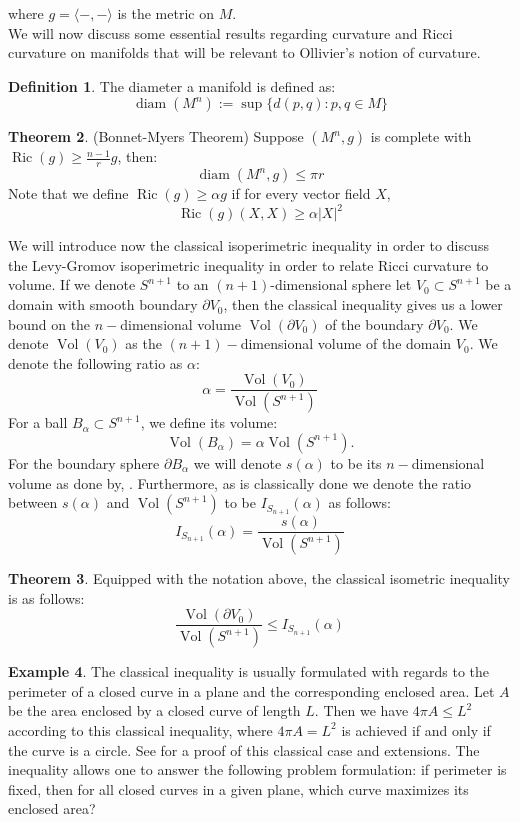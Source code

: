\documentclass{Dissertate}
\theoremstyle{definition}
\newtheorem{theorem}{Theorem}[section]
\theoremstyle{definition} %
\theoremstyle{definition}
\newtheorem{definition}[theorem]{Definition}
\newtheorem{example}[theorem]{Example}
\begin{document}
where $g=\langle-,-\rangle$ is the metric on $M$.\\
\vspace{0.5in}
We will now discuss some essential results regarding curvature and Ricci curvature on manifolds that will be relevant to Ollivier's notion of curvature.

\begin{definition}
The diameter a manifold is defined as:
$$
\operatorname{diam}(M^n):=\sup \{d(p, q): p, q \in M\}
$$
\end{definition}
\begin{theorem} (Bonnet-Myers Theorem)
Suppose $\left(M^{n}, g\right)$ is complete with $\operatorname{Ric}(g) \geq \frac{n-1}{r} g$, then:
$$
\operatorname{diam}\left(M^{n}, g\right) \leq \pi r
$$
Note that we define $\operatorname{Ric}(g) \geq \alpha g$ if for every vector field $X$,
$$
\operatorname{Ric}(g)(X, X) \geq \alpha|X|^{2}
$$
\end{theorem}
We will introduce now the classical isoperimetric inequality in order to discuss the Levy-Gromov isoperimetric inequality in order to relate Ricci curvature to volume.  If we denote $S^{n+1}$ to an $(n+1)$-dimensional sphere let $V_{0} \subset S^{n+1}$ be a domain with smooth boundary $\partial V_{0} $, then the classical inequality gives us a lower bound on the $n-$dimensional volume $\operatorname{Vol}(\partial V_0)$ of the boundary $\partial V_0$. We denote $\operatorname{Vol}(V_0)$ as the $(n+1)-$dimensional volume of the domain $V_0$. We denote the following ratio as $\alpha$:
$$
\alpha = \frac{\operatorname{Vol}(V_0)}{\operatorname{Vol}(S^{n+1})}
$$
For a ball $B_{\alpha} \subset S^{n+1}$, we define its volume:
$$
\operatorname{Vol}(B_{\alpha}) = \alpha \operatorname{Vol} (S^{n+1}).
$$
For the boundary sphere $\partial B_\alpha$ we will denote $s(\alpha)$ to be its $n-$dimensional volume as done by, \cite{GromovMikhail2001CPLI}. Furthermore, as is classically done we denote the ratio between $s(\alpha)$ and $\operatorname{Vol}(S^{n+1})$ to be $I_{S_{n+1}}(\alpha)$ as follows:
$$
I_{S_{n+1}}(\alpha) = \frac{s(\alpha)}{\operatorname{Vol}(S^{n+1})}
$$
\begin{theorem}\label{thm:isoperi} \cite{osserman1978isoperimetric}\cite{GromovMikhail2001CPLI}
Equipped with the notation above, the classical isometric inequality is as follows: 
$$
\frac{\operatorname{Vol}(\partial V_0)}{\operatorname{Vol}(S^{n+1})} \leq I_{S_{n+1}}(\alpha)
$$
\end{theorem}
\begin{example}
The classical inequality is usually formulated with regards to the perimeter of a closed curve in a plane and the corresponding enclosed area. Let $A$ be the area enclosed by a closed curve of length $L$. Then we have $4\pi A \leq L^2$ according to this classical inequality, where $4\pi A = L^2$ is achieved if and only if the curve is a circle. See \cite{osserman1978isoperimetric} for a proof of this classical case and extensions. The inequality allows one to answer the following problem formulation: if perimeter is fixed, then for all closed curves in a given plane, which curve maximizes its enclosed area?
\end{example}
\end{document}
